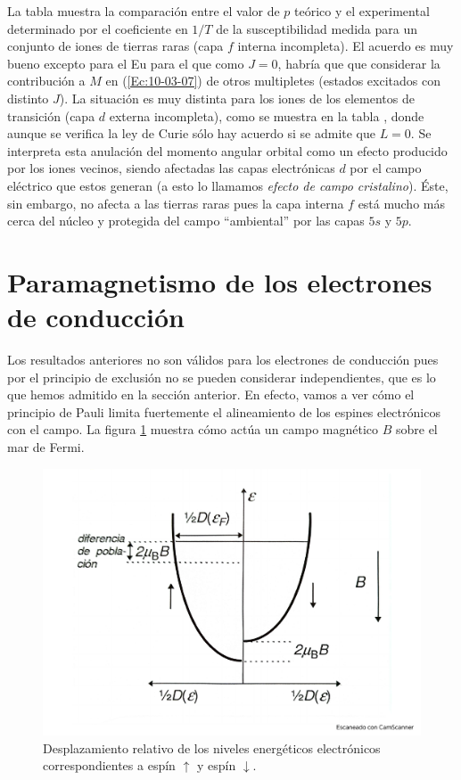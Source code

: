 La tabla muestra la comparación entre el valor de $p$ teórico y el experimental determinado por el coeficiente en $1/T$ de la susceptibilidad medida para un conjunto de iones de tierras raras (capa $f$ interna incompleta). El acuerdo es muy  bueno excepto para el Eu para el que como $J=0$, habría que que considerar la contribución a $M$ en (\ref{Ec:10-03-07}) de otros multipletes (estados excitados con distinto $J$). La situación es muy distinta para los iones de los elementos de transición (capa $d$ externa incompleta), como se muestra en la tabla , donde aunque se verifica la ley de Curie sólo hay acuerdo si se admite que $L=0$. Se interpreta esta anulación del momento angular orbital como un efecto producido por los iones vecinos, siendo afectadas las capas electrónicas $d$ por el campo eléctrico que estos generan (a esto lo llamamos \textit{efecto de campo cristalino}). Éste, sin embargo, no afecta a las tierras raras pues la capa interna $f$ está mucho más cerca del núcleo y protegida del campo ``ambiental'' por las capas $5s$ y $5p$.


\section{Paramagnetismo de los electrones de conducción}

Los resultados anteriores no son válidos para los electrones de conducción pues por el principio de exclusión no se pueden considerar independientes, que es lo que hemos admitido en la sección anterior. En efecto, vamos a ver cómo el principio de Pauli limita fuertemente el alineamiento de los espines electrónicos con el campo. La figura \ref{Fig:10-03} muestra cómo actúa un campo magnético $B$ sobre el mar de Fermi.

\begin{figure}[h!] \centering
	\includegraphics[scale=0.35]{Cuerpo/Ch_10/Fotos libro 3.pdf}
	\caption{Desplazamiento relativo de los niveles energéticos electrónicos correspondientes a espín $\uparrow$ y espín $\downarrow$.}
	\label{Fig:10-03}
\end{figure}

